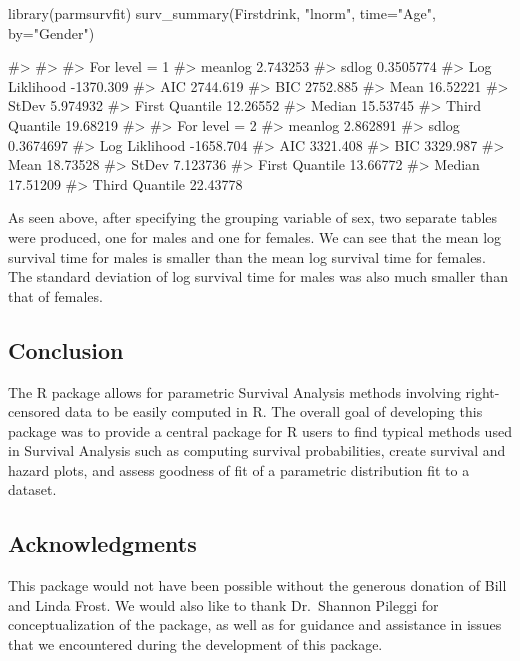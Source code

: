 \begin{Schunk}
\begin{Sinput}
library(parmsurvfit)
surv_summary(Firstdrink, "lnorm", time="Age", by="Gender")
\end{Sinput}
\begin{Soutput}
#> 
#> 
#> For level = 1 
#> meanlog      2.743253
#> sdlog        0.3505774
#> Log Liklihood    -1370.309
#> AIC      2744.619
#> BIC      2752.885
#> Mean     16.52221
#> StDev        5.974932
#> First Quantile   12.26552
#> Median       15.53745
#> Third Quantile   19.68219
#> 
#> For level = 2 
#> meanlog      2.862891
#> sdlog        0.3674697
#> Log Liklihood    -1658.704
#> AIC      3321.408
#> BIC      3329.987
#> Mean     18.73528
#> StDev        7.123736
#> First Quantile   13.66772
#> Median       17.51209
#> Third Quantile   22.43778
\end{Soutput}
\end{Schunk}

As seen above, after specifying the grouping variable of sex, two
separate tables were produced, one for males and one for females. We can
see that the mean log survival time for males is smaller than the mean
log survival time for females. The standard deviation of log survival
time for males was also much smaller than that of females.

\hypertarget{conclusion}{%
\subsection{Conclusion}\label{conclusion}}

The R package  allows for parametric Survival Analysis
methods involving right-censored data to be easily computed in R. The
overall goal of developing this package was to provide a central package
for R users to find typical methods used in Survival Analysis such as
computing survival probabilities, create survival and hazard plots, and
assess goodness of fit of a parametric distribution fit to a dataset.

\hypertarget{acknowledgments}{%
\subsection{Acknowledgments}\label{acknowledgments}}

This package would not have been possible without the generous donation
of Bill and Linda Frost. We would also like to thank Dr.~Shannon Pileggi
for conceptualization of the package, as well as for guidance and
assistance in issues that we encountered during the development of this
package.

